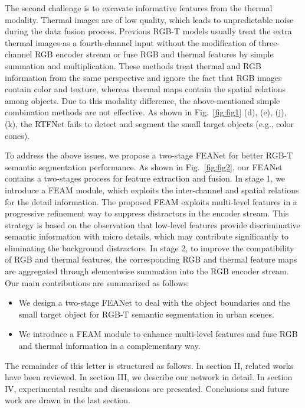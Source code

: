 \documentclass[letterpaper, 10 pt, conference]{ieeeconf}  \usepackage{graphicx}
\begin{document}
The second challenge is to excavate informative features from the thermal modality. Thermal images are of low quality, which leads to unpredictable noise during the data fusion process. Previous RGB-T models usually treat the extra thermal images as a fourth-channel input without the modification of three-channel RGB encoder stream or fuse RGB and thermal features by simple summation and multiplication. These methods treat thermal and RGB information from the same perspective and ignore the fact that RGB images contain color and texture, whereas thermal maps contain the spatial relations among objects. Due to this modality difference, the above-mentioned simple combination methods \cite{sun2019rtfnet} \cite{sun2020fuseseg} are not effective. As shown in Fig.~\ref{fig:fig1} (d), (e), (j), (k), the RTFNet fails to detect and segment the small target objects (e.g., color cones).

To address the above issues, we propose a two-stage FEANet for better RGB-T semantic segmentation performance. As shown in Fig.~\ref{fig:fig2}, our FEANet contains a two-stages process for feature extraction and fusion. In stage 1, we introduce a FEAM module, which exploits the inter-channel and spatial relations for the detail information. The proposed FEAM exploits multi-level features in a progressive refinement way to suppress distractors in the encoder stream. This strategy is based on the observation that low-level features provide discriminative semantic information with micro details, which may contribute significantly to eliminating the background distractors. In stage 2, to improve the compatibility of RGB and thermal features, the corresponding RGB and thermal feature maps are aggregated through elementwise summation into the RGB encoder stream. Our main contributions are summarized as follows:

\begin{itemize}

\item We design a two-stage FEANet to deal with the object boundaries and the small target object for RGB-T semantic segmentation in urban scenes.
\item We introduce a FEAM module to enhance multi-level features and fuse RGB and thermal information in a complementary way.

\end{itemize}

The remainder of this letter is structured as follows. In section II, related works have been reviewed. In section III, we describe our network in detail. In section IV, experimental results and discussions are presented. Conclusions and future work are drawn in the last section.
\end{document}
